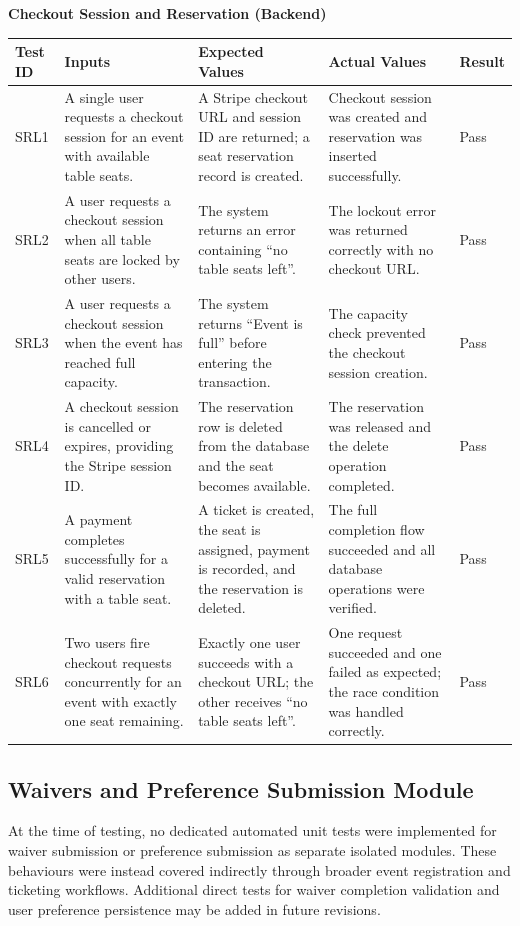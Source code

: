 \documentclass[12pt, titlepage]{article}
\begin{document}
\textbf{Checkout Session and Reservation (Backend)}

{\small
\setlength{\tabcolsep}{4pt}
\begin{tabularx}{\textwidth}{L{1.6cm}Y Y Y L{1.4cm}}
\toprule
\textbf{Test ID} & \textbf{Inputs} & \textbf{Expected Values} & \textbf{Actual Values} & \textbf{Result} \\
\midrule
SRL1 & A single user requests a checkout session for an event with available table seats. & A Stripe checkout URL and session ID are returned; a seat reservation record is created. & Checkout session was created and reservation was inserted successfully. & Pass \\
SRL2 & A user requests a checkout session when all table seats are locked by other users. & The system returns an error containing ``no table seats left''. & The lockout error was returned correctly with no checkout URL. & Pass \\
SRL3 & A user requests a checkout session when the event has reached full capacity. & The system returns ``Event is full'' before entering the transaction. & The capacity check prevented the checkout session creation. & Pass \\
SRL4 & A checkout session is cancelled or expires, providing the Stripe session ID. & The reservation row is deleted from the database and the seat becomes available. & The reservation was released and the delete operation completed. & Pass \\
SRL5 & A payment completes successfully for a valid reservation with a table seat. & A ticket is created, the seat is assigned, payment is recorded, and the reservation is deleted. & The full completion flow succeeded and all database operations were verified. & Pass \\
SRL6 & Two users fire checkout requests concurrently for an event with exactly one seat remaining. & Exactly one user succeeds with a checkout URL; the other receives ``no table seats left''. & One request succeeded and one failed as expected; the race condition was handled correctly. & Pass \\
\bottomrule
\end{tabularx}
}

\subsection{Waivers and Preference Submission Module}

At the time of testing, no dedicated automated unit tests were implemented for waiver submission or preference submission as separate isolated modules. These behaviours were instead covered indirectly through broader event registration and ticketing workflows. Additional direct tests for waiver completion validation and user preference persistence may be added in future revisions.
\end{document}
